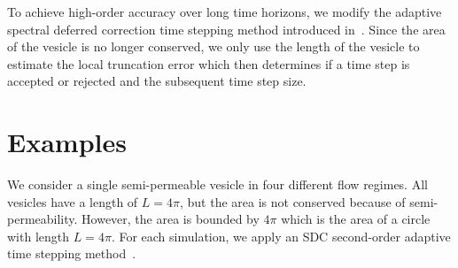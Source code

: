 \documentclass[9pt,twocolumn,twoside,lineno]{pnas-new}
\begin{document}
To achieve high-order accuracy over long time horizons, we modify the
adaptive spectral deferred correction time stepping method introduced
in~\cite{qua-bir2016}. Since the area of the vesicle is no longer
conserved, we only use the length of the vesicle to estimate the
local truncation error which then determines if a time step is accepted
or rejected and the subsequent time step size.

\section*{Examples}
We consider a single semi-permeable vesicle in four different flow
regimes. All vesicles have a length of $L=4\pi$, but the area is not
conserved because of semi-permeability. However, the area is bounded by
$4\pi$ which is the area of a circle with length $L=4\pi$. For each
simulation, we apply an SDC second-order adaptive time stepping
method~\cite{qua-bir2016}. 



\end{document}
